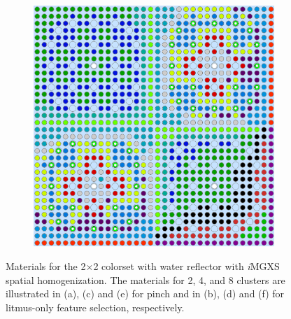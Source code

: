 \begin{figure}[h!]
\begin{subfigure}{0.47\textwidth}
  \caption{}
  \label{fig:chap10-reflector-pinch-8}
\end{subfigure}%
\begin{subfigure}{0.47\textwidth}
  \centering
  \includegraphics[width=0.9\linewidth]{figures/unsupervised/geometries/with-features/8-clusters/combined/reflector}
  \caption{}
  \label{fig:chap10-reflector-combined-8}
\end{subfigure}
\caption[Clustered geometries for a 2$\times$2 colorset with reflector]{Materials for the 2$\times$2 colorset with water reflector with \textit{i}\ac{MGXS} spatial homogenization. The materials for 2, 4, and 8 clusters are illustrated in (a), (c) and (e) for pinch and in (b), (d) and (f) for litmus-only feature selection, respectively.}
\label{fig:chap10-reflector-geometries}
\end{figure}

\clearpage

